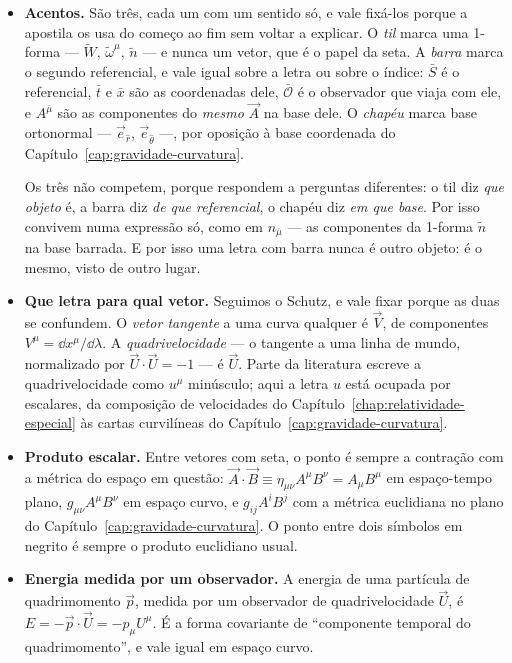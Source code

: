 \documentclass[12pt,a4paper,oneside]{book}
\theoremstyle{rgplain}
\theoremstyle{rgremark}
\newcommand{\obsl}{\bar{\mathcal{O}}}
\begin{document}
\begin{itemize}[leftmargin=1.4em,itemsep=0.35em]
  \item \textbf{Acentos.} São três, cada um com um sentido só, e vale
  fixá-los porque a apostila os usa do começo ao fim sem voltar a explicar.
  O \emph{til} marca uma 1-forma --- $\tilde W$, $\tilde\omega^\mu$,
  $\tilde n$ --- e nunca um vetor, que é o papel da seta. A \emph{barra}
  marca o segundo referencial, e vale igual sobre a letra ou sobre o índice:
  $\bar S$ é o referencial, $\bar t$ e $\bar x$ são as coordenadas dele,
  $\obsl$ é o observador que viaja com ele, e $A^{\bar\mu}$ são as
  componentes do \emph{mesmo} $\vec A$ na base dele. O \emph{chapéu} marca
  base ortonormal --- $\vec e_{\hat r}$, $\vec e_{\hat\theta}$ ---, por
  oposição à base coordenada do Capítulo~\ref{cap:gravidade-curvatura}.

  Os três não competem, porque respondem a perguntas diferentes: o til diz
  \emph{que objeto} é, a barra diz \emph{de que referencial}, o chapéu diz
  \emph{em que base}. Por isso convivem numa expressão só, como em
  $n_{\bar\mu}$ --- as componentes da 1-forma $\tilde n$ na base barrada.
  E por isso uma letra com barra nunca é outro objeto: é o mesmo, visto de
  outro lugar.

  \item \textbf{Que letra para qual vetor.} Seguimos o Schutz, e vale fixar
  porque as duas se confundem. O \emph{vetor tangente} a uma curva qualquer é
  $\vec V$, de componentes $V^\mu=\dd x^\mu/\dd\lambda$. A
  \emph{quadrivelocidade} --- o tangente a uma linha de mundo, normalizado por
  $\vec U\cdot\vec U=-1$ --- é $\vec U$. Parte da literatura escreve a
  quadrivelocidade como $u^\mu$ minúsculo; aqui a letra $u$ está ocupada por
  escalares, da composição de velocidades do Capítulo~\ref{chap:relatividade-especial}
  às cartas curvilíneas do Capítulo~\ref{cap:gravidade-curvatura}.

  \item \textbf{Produto escalar.} Entre vetores com seta, o ponto é sempre a
  contração com a métrica do espaço em questão:
  $\vec A\cdot\vec B\equiv\eta_{\mu\nu}A^\mu B^\nu=A_\mu B^\mu$ em
  espaço-tempo plano, $g_{\mu\nu}A^\mu B^\nu$ em espaço curvo, e
  $g_{ij}A^iB^j$ com a métrica euclidiana no plano do
  Capítulo~\ref{cap:gravidade-curvatura}. O ponto entre dois símbolos em
  negrito é sempre o produto euclidiano usual.

  \item \textbf{Energia medida por um observador.} A energia de uma partícula
  de quadrimomento $\vec p$, medida por um observador de quadrivelocidade
  $\vec U$, é $E=-\vec p\cdot\vec U=-p_\mu U^\mu$. É a forma covariante de
  ``componente temporal do quadrimomento'', e vale igual em espaço curvo.
\end{itemize}
\end{document}
